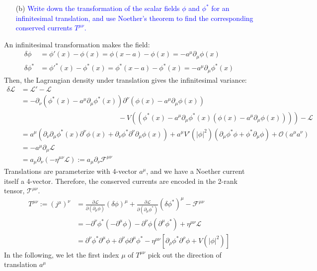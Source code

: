 \documentclass[11pt, a4paper]{article}
\begin{document}
\begin{enumerate}
    \item [(b)] \textcolor{blue}{
    Write down the transformation of the scalar fields $\phi$ and $\phi^*$ for an infinitesimal translation, and use Noether's theorem to find the corresponding conserved currents $T^{\mu\nu}$.
    }
\end{enumerate}
An infinitesimal transformation makes the field:
\begin{align}
    \delta\phi & = \phi'(x) - \phi(x) = \phi(x-a) - \phi(x) = -a^\mu \partial_\mu \phi(x)\\
    \delta\phi^* & = \phi'^*(x) - \phi^*(x) = \phi^*(x-a) - \phi^*(x) = -a^\mu \partial_\mu \phi^*(x)
\end{align}
Then, the Lagrangian density under translation gives the infinitesimal variance:
\begin{align}
    \delta\mathcal{L} & = \mathcal{L}' - \mathcal{L} \\
    & = - \partial_\nu(\phi^*(x) - a^\mu\partial_\mu\phi^*(x)) \partial^\nu (\phi(x) - a^\mu\partial_\mu\phi(x)) \\
    & \quad \quad \quad \quad \quad \quad \quad \quad \quad \quad \quad \quad \quad \quad 
    - V\left( (\phi^*(x) - a^\mu\partial_\mu\phi^*(x)(\phi(x) - a^\mu\partial_\mu\phi(x)))  \right) - \mathcal{L} \\
    & = a^\mu(\partial_\nu\partial_\mu \phi^*(x) \partial^\nu \phi(x) + \partial_\nu \phi^* \partial^\nu \partial_\mu \phi(x)) + a^\mu V'(|\phi|^2)(\partial_\mu\phi^* \phi+\phi^* \partial_\mu\phi) + \mathcal{O}(a^\mu a^\nu) \\
    & = -a^\mu \partial_\mu \mathcal{L} \\
    & = a_\mu \partial_\nu (-\eta^{\mu\nu} \mathcal{L}) := a_\mu \partial_\nu \mathcal{F}^{\mu\nu}
\end{align}
Translations are parameterize with 4-vector $a^\mu$, and we have a Noether current itself a 4-vector.
Therefore, the conserved currents are encoded in the 2-rank tensor, $\mathcal{T}^{\mu\nu}$.
\begin{align}
    T^{\mu\nu} := (j^\mu)^\nu & = \frac{\partial \mathcal{L}}{\partial (\partial_\mu \phi)}(\delta\phi)^\mu + \frac{\partial \mathcal{L}}{\partial (\partial_\mu \phi^*)}(\delta\phi^*)^\mu - \mathcal{F}^{\mu\nu} \\
    & = - \partial^\nu \phi^* (-\partial^\mu \phi) - \partial^\nu\phi(\partial^\mu\phi^*) + \eta^{\mu\nu}\mathcal{L} \\
    & =  \partial^\nu \phi^* \partial^\mu \phi + \partial^\nu\phi \partial^\mu\phi^* - \eta^{\mu\nu}\left[\partial_\rho \phi^* \partial^\rho \phi + V(|\phi|^2) \right]
\end{align}
In the following, we let the first index $\mu$ of $T^{\mu\nu}$ pick out the direction of translation $a^\mu$
\end{document}
